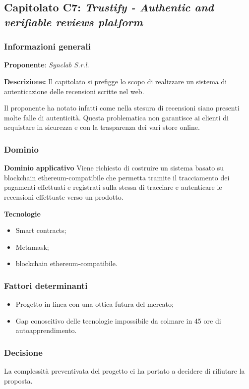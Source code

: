 \subsection{Capitolato C7: \textit{Trustify - Authentic and verifiable reviews platform }}
\subsubsection{Informazioni generali}

\textbf{Proponente}: \textit{Synclab S.r.l.} 

\textbf{Descrizione:}
Il capitolato si prefigge lo scopo di realizzare un sistema di autenticazione delle recensioni scritte nel web.

Il proponente ha notato infatti come nella stesura di recensioni siano presenti molte falle di autenticità. Questa problematica non garantisce ai clienti di acquistare in sicurezza e con la trasparenza dei vari store online.

\subsubsection{Dominio}

\textbf{Dominio applicativo}
Viene richiesto di costruire un sistema basato su blockchain ethereum-compatibile che permetta tramite il tracciamento dei pagamenti effettuati e registrati sulla stessa di tracciare e autenticare le recensioni effettuate verso un prodotto.

\textbf{Tecnologie}

\begin{itemize}
    \item Smart contracts;
    \item Metamask;
    \item blockchain ethereum-compatibile. 
\end{itemize}

\subsubsection{Fattori determinanti}
\begin{itemize}
    \item Progetto in linea con una ottica futura del mercato;
    \item Gap conoscitivo delle tecnologie impossibile da colmare in 45 ore di autoapprendimento.
\end{itemize}
\subsubsection{Decisione}

La complessità preventivata del progetto ci ha portato a decidere di rifiutare la proposta.
